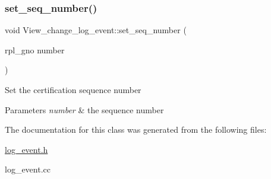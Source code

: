 \subsubsection{\texorpdfstring{set\+\_\+seq\+\_\+number()}{set\_seq\_number()}}
{\footnotesize\ttfamily void View\+\_\+change\+\_\+log\+\_\+event\+::set\+\_\+seq\+\_\+number (\begin{DoxyParamCaption}\item[{rpl\+\_\+gno}]{number }\end{DoxyParamCaption})\hspace{0.3cm}{\ttfamily [inline]}}

Set the certification sequence number


\begin{DoxyParams}{Parameters}
{\em number} & the sequence number \\
\hline
\end{DoxyParams}


The documentation for this class was generated from the following files\+:\begin{DoxyCompactItemize}
\item 
\mbox{\hyperlink{log__event_8h}{log\+\_\+event.\+h}}\item 
log\+\_\+event.\+cc\end{DoxyCompactItemize}
